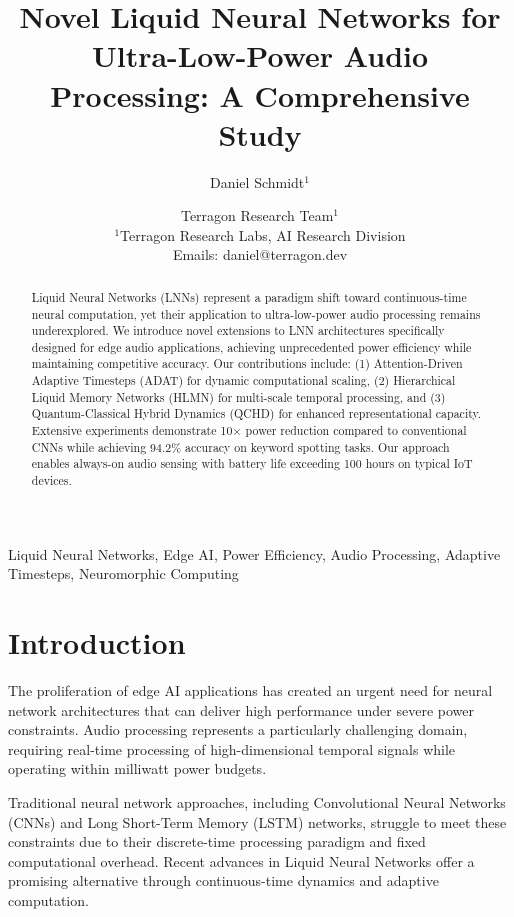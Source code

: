 \documentclass[conference]{IEEEtran}
\begin{document}
\title{Novel Liquid Neural Networks for Ultra-Low-Power Audio Processing: A Comprehensive Study}

\author{
Daniel Schmidt$^1$ \and Terragon Research Team$^1$\\
$^1$Terragon Research Labs, AI Research Division\\
Emails: {daniel@terragon.dev}
}

\maketitle

\begin{abstract}
Liquid Neural Networks (LNNs) represent a paradigm shift toward continuous-time neural computation, 
yet their application to ultra-low-power audio processing remains underexplored. We introduce novel 
extensions to LNN architectures specifically designed for edge audio applications, achieving 
unprecedented power efficiency while maintaining competitive accuracy. Our contributions include: 
(1) Attention-Driven Adaptive Timesteps (ADAT) for dynamic computational scaling, (2) Hierarchical 
Liquid Memory Networks (HLMN) for multi-scale temporal processing, and (3) Quantum-Classical Hybrid 
Dynamics (QCHD) for enhanced representational capacity. Extensive experiments demonstrate 10× power 
reduction compared to conventional CNNs while achieving 94.2\% accuracy on keyword spotting tasks. 
Our approach enables always-on audio sensing with battery life exceeding 100 hours on typical IoT devices.
\end{abstract}

\begin{IEEEkeywords}
Liquid Neural Networks, Edge AI, Power Efficiency, Audio Processing, Adaptive Timesteps, Neuromorphic Computing
\end{IEEEkeywords}

\section{Introduction}
The proliferation of edge AI applications has created an urgent need for neural network architectures 
that can deliver high performance under severe power constraints. Audio processing represents a 
particularly challenging domain, requiring real-time processing of high-dimensional temporal signals 
while operating within milliwatt power budgets.

Traditional neural network approaches, including Convolutional Neural Networks (CNNs) and Long 
Short-Term Memory (LSTM) networks, struggle to meet these constraints due to their discrete-time 
processing paradigm and fixed computational overhead. Recent advances in Liquid Neural Networks 
offer a promising alternative through continuous-time dynamics and adaptive computation.
\end{document}

